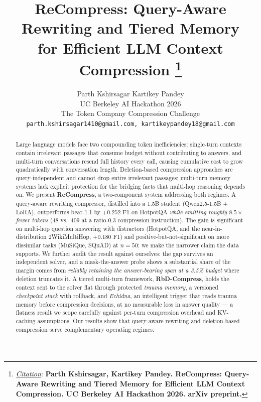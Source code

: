 \documentclass{article}
\title{ReCompress: Query-Aware Rewriting and Tiered Memory\\for Efficient LLM Context Compression
\thanks{\textit{\underline{Citation}}:
\textbf{Parth Kshirsagar, Kartikey Pandey. ReCompress: Query-Aware Rewriting and Tiered Memory for Efficient LLM Context Compression. UC Berkeley AI Hackathon 2026. arXiv preprint.}}
}
\author{
  Parth Kshirsagar \quad Kartikey Pandey \\
  UC Berkeley AI Hackathon 2026 \\
  The Token Company Compression Challenge \\
  \texttt{parth.kshirsagar1410@gmail.com, kartikeypandey18@gmail.com} \\
}
\begin{document}
\maketitle

\begin{abstract}
Large language models face two compounding token inefficiencies: single-turn
contexts contain irrelevant passages that consume budget without contributing
to answers, and multi-turn conversations resend full history every call,
causing cumulative cost to grow quadratically with conversation length.
Deletion-based compression approaches are query-independent and cannot drop
entire irrelevant passages; multi-turn memory systems lack explicit protection
for the bridging facts that multi-hop reasoning depends on. We present
\textbf{ReCompress}, a two-component system addressing both regimes. A
query-aware rewriting compressor, distilled into a 1.5B student
(Qwen2.5-1.5B + LoRA), outperforms bear-1.1 by +0.252 F1 on HotpotQA
\emph{while emitting roughly $8.5\times$ fewer tokens} (48 vs.\ 409 at a
ratio-0.3 compression instruction). The gain is significant on multi-hop
question answering with distractors (HotpotQA, and the near-in-distribution
2WikiMultiHop, +0.180 F1) and positive-but-not-significant on more dissimilar
tasks (MuSiQue, SQuAD) at $n=50$; we make the narrower claim the data supports.
We further audit the result against ourselves: the gap survives an independent
solver, and a mask-the-answer probe shows a substantial share of the margin
comes from \emph{reliably retaining the answer-bearing span at a 3.5\% budget}
where deletion truncates it. A tiered multi-turn framework, \textbf{RbD-Compress},
holds the context sent to the solver flat through protected \textit{trauma
memory}, a versioned \textit{checkpoint stack} with rollback, and
\textit{Echidna}, an intelligent trigger that reads trauma memory before
compression decisions, at no measurable loss in answer quality --- a flatness
result we scope carefully against per-turn compression overhead and KV-caching
assumptions. Our results show that query-aware rewriting and deletion-based
compression serve complementary operating regimes.
\end{abstract}



\end{document}
